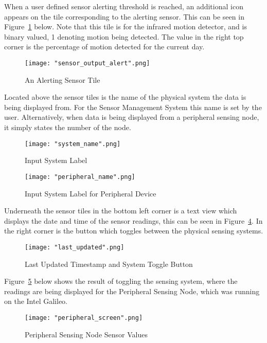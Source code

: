 \documentclass{article}
\begin{document}
\noindent
When a user defined sensor alerting threshold is reached, an additional icon appears on the tile corresponding to the alerting sensor. This can be seen in Figure~\ref{fig:android_sensor_tile_alerting} below. Note that this tile is for the infrared motion detector, and is binary valued, 1 denoting motion being detected. The value in the right top corner is the percentage of motion detected for the current day. 
\begin{figure}[H]
\centering
\texttt{[image: "sensor\_output\_alert".png]}
\caption{An Alerting Sensor Tile }
\label{fig:android_sensor_tile_alerting}
\end{figure}

\noindent
Located above the sensor tiles is the name of the physical system the data is being displayed from. For the Sensor Management System this name is set by the user. Alternatively, when data is being displayed from a peripheral sensing node, it simply states the number of the node.
\begin{figure}[H]
\centering
\texttt{[image: "system\_name".png]}
\caption{Input System Label}
\label{fig:android_sensor_input_system}
\end{figure}

\begin{figure}[H]
\centering
\texttt{[image: "peripheral\_name".png]}
\caption{Input System Label for Peripheral Device}
\label{fig:android_sensor_input_system_peripheral}
\end{figure}

\noindent
Underneath the sensor tiles in the bottom left corner is a text view which displays the date and time of the sensor readings, this can be seen in Figure~\ref{fig:android_sensor_timestamp}. In the right corner is the button which toggles between the physical sensing systems.
\begin{figure}[H]
\centering
\texttt{[image: "last\_updated".png]}
\caption{Last Updated Timestamp and System Toggle Button}
\label{fig:android_sensor_timestamp}
\end{figure}

\noindent
Figure~\ref{fig:android_peripheral_sensing_values} below shows the result of toggling the sensing system, where the readings are being displayed for the Peripheral Sensing Node, which was running on the Intel Galileo.
\begin{figure}[H]
\centering
\texttt{[image: "peripheral\_screen".png]}
\caption{Peripheral Sensing Node Sensor Values}
\label{fig:android_peripheral_sensing_values}
\end{figure}
\end{document}
